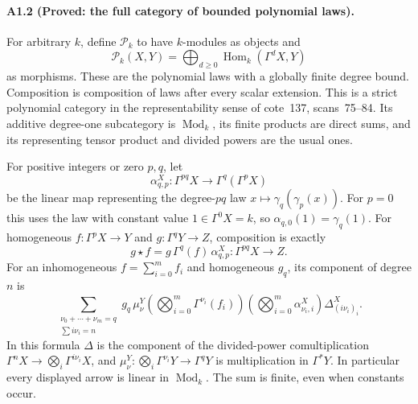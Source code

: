 \paragraph{A1.2 (Proved: the full category of bounded polynomial laws).}
For arbitrary $k$, define $\mathcal P_k$ to have $k$-modules as objects and
\[
 \mathcal P_k(X,Y)=\bigoplus_{d\geq0}
     \operatorname{Hom}_k(\Gamma^d X,Y)
\]
as morphisms. These are the polynomial laws with a globally finite degree
bound. Composition is composition of laws after every scalar extension.
This is a strict polynomial category in the representability sense of
cote~137, scans~75--84. Its additive degree-one subcategory is
$\operatorname{Mod}_k$, its finite products are direct sums, and its
representing tensor product and divided powers are the usual ones.

For positive integers or zero $p,q$, let
\[
 \alpha_{q,p}^X:\Gamma^{pq}X\longrightarrow
                    \Gamma^q(\Gamma^pX)
\]
be the linear map representing the degree-$pq$ law
$x\mapsto\gamma_q(\gamma_p(x))$. For $p=0$ this uses the law with
constant value $1\in\Gamma^0X=k$, so $\alpha_{q,0}(1)=\gamma_q(1)$.
For homogeneous $f:\Gamma^pX\to Y$ and
$g:\Gamma^qY\to Z$, composition is exactly
\[
 g\mathbin{\star}f=g\,\Gamma^q(f)\,\alpha_{q,p}^X:
             \Gamma^{pq}X\longrightarrow Z.
 \tag{A1.3}
\]
For an inhomogeneous $f=\sum_{i=0}^m f_i$ and homogeneous $g_q$, its
component of degree $n$ is
\[
 \sum_{\substack{\nu_0+\cdots+\nu_m=q\\
                  \sum i\nu_i=n}}
 g_q\,\mu_\nu^Y
 \left(\bigotimes_{i=0}^m\Gamma^{\nu_i}(f_i)\right)
 \left(\bigotimes_{i=0}^m\alpha_{\nu_i,i}^X\right)
 \Delta_{(i\nu_i)_i}^X .
 \tag{A1.4}
\]
In this formula $\Delta$ is the component of the divided-power
comultiplication
$\Gamma^nX\to\bigotimes_i\Gamma^{i\nu_i}X$, and
$\mu_\nu^Y:\bigotimes_i\Gamma^{\nu_i}Y\to\Gamma^qY$ is multiplication
in $\Gamma^*Y$. In particular every displayed arrow is linear in
$\operatorname{Mod}_k$. The sum is finite, even when constants occur.

